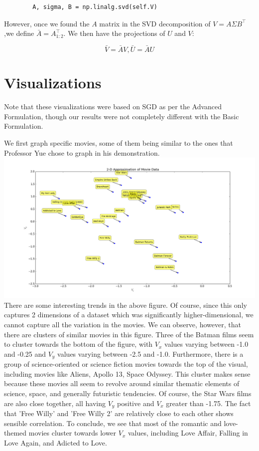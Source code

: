 \documentclass{article}
\begin{document}
\begin{verbatim}
        A, sigma, B = np.linalg.svd(self.V)
\end{verbatim}

\noindent However, once we found the $A$ matrix in the SVD decomposition of $V = A
\Sigma B^{\intercal}$,we define $\bar{A} = A_{1:2}^{\intercal}$. We then have
the projections of $U$ and $V$:

$$ \bar{V} = \bar{A} V, \bar{U} = \bar{A} U $$

\section*{Visualizations}
Note that these visualizations were based on SGD as per the Advanced Formulation,
though our results were not completely different with the Basic Formulation.

We first graph specific movies, some of them being similar to the ones
that Professor Yue chose to graph in his demonstration.\\
\includegraphics[width=1\textwidth]{final_graph_1}
There are some interesting trends in the above figure. Of course, since
this only captures 2 dimensions of a dataset which was significantly
higher-dimensional, we cannot capture all the variation in the movies.
We can observe, however, that there are clusters of similar movies
in this figure. Three of the Batman films seem to cluster towards the bottom
of the figure, with $V_{x}$ values varying between -1.0 and -0.25 and
$V_y$ values varying between -2.5 and -1.0. Furthermore, there is a group
of science-oriented or science fiction movies towards the top of the visual,
including movies like Aliens, Apollo 13, Space Odyssey. This cluster makes
sense because these movies all seem to revolve around similar thematic elements
of science, space, and generally futuristic tendencies. Of course, the Star Wars
films are also close together, all having $V_{y}$ positive and $V_x$ greater than
-1.75. The fact that 'Free Willy' and 'Free Willy 2' are relatively close
to each other shows sensible correlation. To conclude, we see that most of
the romantic and love-themed movies cluster towards lower $V_x$ values,
including Love Affair, Falling in Love Again, and Adicted to Love.
\end{document}
